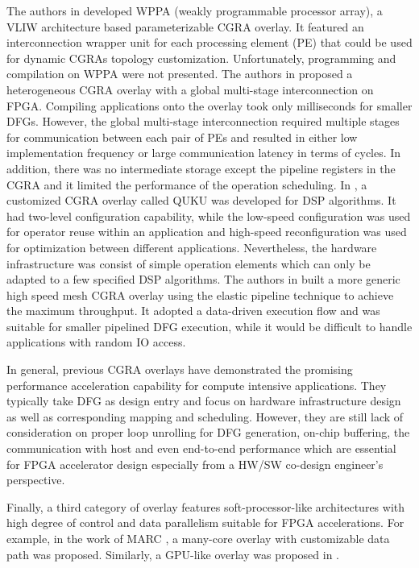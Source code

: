The authors in \cite{kissler2006dynamically} developed WPPA (weakly programmable processor array), a VLIW architecture based parameterizable CGRA overlay. It featured an interconnection wrapper unit for each processing element (PE) that could be used for dynamic CGRAs topology customization. Unfortunately, programming and compilation on WPPA were not presented. The authors in \cite{ferreira2011fpga} proposed a heterogeneous CGRA overlay with a global multi-stage interconnection on FPGA. Compiling applications onto the overlay took only milliseconds for smaller DFGs. However, the global multi-stage interconnection required multiple stages for communication between each pair of PEs and resulted in either low implementation frequency or large communication latency in terms of cycles. In addition, there was no intermediate storage except the pipeline registers in the CGRA and it limited the performance of the operation scheduling.
In \cite{shukla2006quku}, a customized CGRA overlay called QUKU was developed for DSP algorithms. It had two-level configuration capability, while the low-speed configuration was used for operator reuse within an application and high-speed reconfiguration was used for optimization between different applications. Nevertheless, the hardware infrastructure was consist of simple operation elements which can only be adapted to a few specified DSP algorithms.
The authors in \cite{capalijia2013pipelined} built a more generic high speed mesh CGRA overlay using the elastic pipeline technique to achieve the maximum throughput. It adopted a data-driven execution flow and was suitable for smaller pipelined DFG execution, while it would be difficult to handle applications with random IO access. 

In general, previous CGRA overlays have demonstrated the promising performance acceleration capability for compute intensive applications. They typically take DFG as design entry and focus on hardware infrastructure design as well as corresponding mapping and scheduling. However, they are still lack of consideration on proper loop unrolling for DFG generation, on-chip buffering, the communication with host and even end-to-end performance which are essential for FPGA accelerator design especially from a HW/SW co-design engineer's perspective. 


Finally, a third category of overlay features soft-processor-like architectures with high degree of control and data parallelism suitable for FPGA accelerations.  For example, in the work of MARC \cite{Lebedev2010}, a many-core overlay with customizable data path was proposed.  Similarly, a GPU-like overlay was proposed in \cite{Jeffrey2011potential}.


